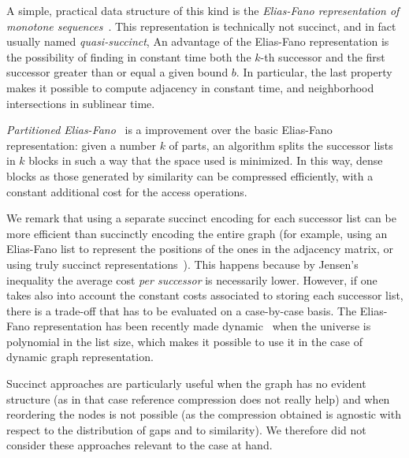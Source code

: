 A simple, practical data structure of this kind is the \emph{Elias-Fano
representation of monotone sequences}~\cite{EliESRCASF}. This representation
is technically not succinct, and in fact usually named \emph{quasi-succinct},
An advantage of the
Elias-Fano representation is the possibility of finding in constant time both
the $k$-th successor and the first successor greater than or equal a
given bound $b$. In particular, the last property makes it possible to compute
adjacency in constant time, and neighborhood intersections in sublinear time.

\emph{Partitioned Elias-Fano}~\cite{OtVPEFI} is a improvement over the basic
Elias-Fano representation: given a number $k$ of parts, an algorithm splits
the successor lists in $k$ blocks in such a way that the space used is
minimized. In this way, dense blocks as those generated by similarity can be
compressed efficiently, with a constant additional cost for the access
operations.

We remark that using a separate succinct encoding for each successor list can
be more efficient than succinctly encoding the entire graph (for example, using
an Elias-Fano list to represent the positions of the ones in the adjacency
matrix, or using truly succinct representations~\cite{FaMSEAG}). This happens
because by Jensen's inequality the average cost \emph{per successor} is
necessarily lower.  However, if one takes also into account the constant costs
associated to storing each successor list, there is a trade-off that has to be
evaluated on a case-by-case basis.  The Elias-Fano representation has been
recently made dynamic~\cite{PiVDEFR} when the universe is polynomial in the
list size, which makes it possible to use it in the case of dynamic graph
representation.

Succinct approaches are particularly useful when the graph has no evident
structure (as in that case reference compression does not really help) and when
reordering the nodes is not possible (as the compression obtained is agnostic
with respect to the distribution of gaps and to similarity). We therefore did
not consider these approaches relevant to the case at hand.
